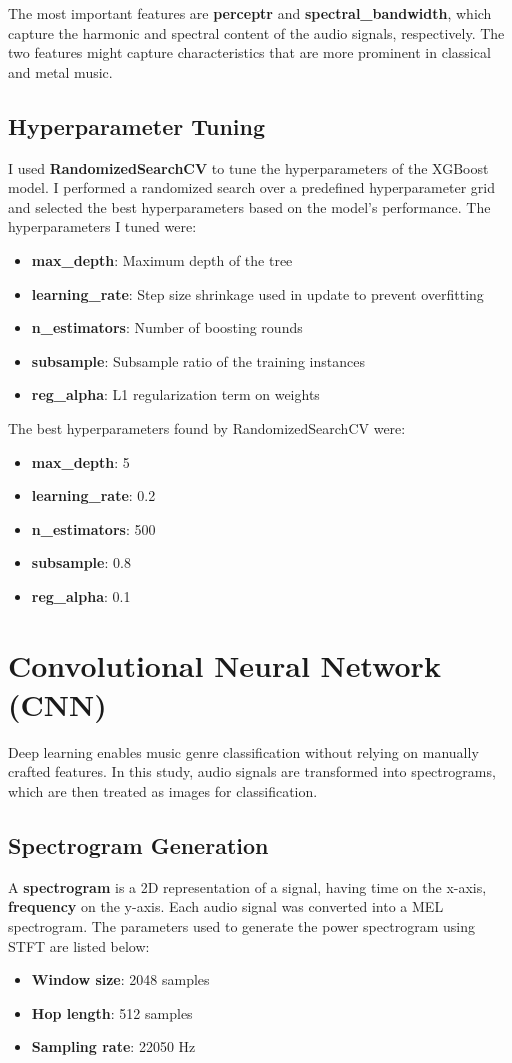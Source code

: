 \documentclass[11.5pt]{article}
\begin{document}
The most important features are \textbf{perceptr} and \textbf{spectral\_bandwidth}, which capture the harmonic and spectral content of the audio signals, respectively. The two features might capture characteristics that are more prominent in classical and metal music.


\subsection{Hyperparameter Tuning}
I used \textbf{RandomizedSearchCV} to tune the hyperparameters of the XGBoost model. I performed a randomized search over a predefined hyperparameter grid and selected the best hyperparameters based on the model's performance. The hyperparameters I tuned were:
\begin{itemize}
    \item \textbf{max\_depth}: Maximum depth of the tree
    \item \textbf{learning\_rate}: Step size shrinkage used in update to prevent overfitting
    \item \textbf{n\_estimators}: Number of boosting rounds
    \item \textbf{subsample}: Subsample ratio of the training instances
    \item \textbf{reg\_alpha}: L1 regularization term on weights
\end{itemize}
The best hyperparameters found by RandomizedSearchCV were:
\begin{itemize}
    \item \textbf{max\_depth}: 5
    \item \textbf{learning\_rate}: 0.2
    \item \textbf{n\_estimators}: 500
    \item \textbf{subsample}: 0.8
    \item \textbf{reg\_alpha}: 0.1
\end{itemize}

\pagebreak
\section{Convolutional Neural Network (CNN)} \label{sec:cnn}
Deep learning enables music genre classification without relying on manually crafted features. In this study, audio signals are transformed into spectrograms, which are then treated as images for classification.

\subsection{Spectrogram Generation}
A \textbf{spectrogram} is a 2D representation of a signal, having time on the x-axis, \textbf{frequency} on the y-axis. Each audio signal was converted into a MEL spectrogram. The parameters used to generate the power spectrogram using STFT are listed below:
\begin{itemize}
    \item \textbf{Window size}: 2048 samples
    \item \textbf{Hop length}: 512 samples
    \item \textbf{Sampling rate}: 22050 Hz
\end{itemize}
\end{document}
